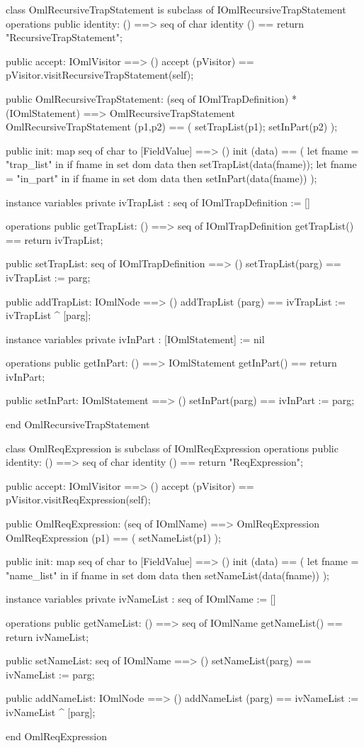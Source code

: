 \begin{vdm_al}
class OmlRecursiveTrapStatement is subclass of IOmlRecursiveTrapStatement
operations
  public identity: () ==> seq of char
  identity () == return "RecursiveTrapStatement";

  public accept: IOmlVisitor ==> ()
  accept (pVisitor) == pVisitor.visitRecursiveTrapStatement(self);

  public OmlRecursiveTrapStatement:
      (seq of IOmlTrapDefinition) *
      (IOmlStatement) ==> OmlRecursiveTrapStatement
  OmlRecursiveTrapStatement (p1,p2) == 
   ( setTrapList(p1);
     setInPart(p2) );

  public init: map seq of char to [FieldValue] ==> ()
  init (data) ==
    ( let fname = "trap_list" in
        if fname in set dom data
        then setTrapList(data(fname));
      let fname = "in_part" in
        if fname in set dom data
        then setInPart(data(fname)) );

instance variables
  private ivTrapList : seq of IOmlTrapDefinition := []

operations
  public getTrapList: () ==> seq of IOmlTrapDefinition
  getTrapList() == return ivTrapList;

  public setTrapList: seq of IOmlTrapDefinition ==> ()
  setTrapList(parg) == ivTrapList := parg;

  public addTrapList: IOmlNode ==> ()
  addTrapList (parg) == ivTrapList := ivTrapList ^ [parg];

instance variables
  private ivInPart : [IOmlStatement] := nil

operations
  public getInPart: () ==> IOmlStatement
  getInPart() == return ivInPart;

  public setInPart: IOmlStatement ==> ()
  setInPart(parg) == ivInPart := parg;

end OmlRecursiveTrapStatement
\end{vdm_al}

\begin{vdm_al}
class OmlReqExpression is subclass of IOmlReqExpression
operations
  public identity: () ==> seq of char
  identity () == return "ReqExpression";

  public accept: IOmlVisitor ==> ()
  accept (pVisitor) == pVisitor.visitReqExpression(self);

  public OmlReqExpression:
      (seq of IOmlName) ==> OmlReqExpression
  OmlReqExpression (p1) == 
   ( setNameList(p1) );

  public init: map seq of char to [FieldValue] ==> ()
  init (data) ==
    ( let fname = "name_list" in
        if fname in set dom data
        then setNameList(data(fname)) );

instance variables
  private ivNameList : seq of IOmlName := []

operations
  public getNameList: () ==> seq of IOmlName
  getNameList() == return ivNameList;

  public setNameList: seq of IOmlName ==> ()
  setNameList(parg) == ivNameList := parg;

  public addNameList: IOmlNode ==> ()
  addNameList (parg) == ivNameList := ivNameList ^ [parg];

end OmlReqExpression
\end{vdm_al}

